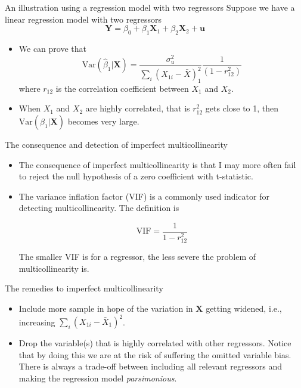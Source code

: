 \documentclass[presentation,10pt]{beamer}
\newcommand{\var}{\mathrm{Var}}
\begin{document}
\begin{frame}[label={sec:orgf4c85d3}]{An illustration using a regression model with two regressors}
Suppose we have a linear regression model with two regressors
\begin{equation}
\label{eq:ex-collin}
\mathbf{Y} = \beta_0 + \beta_1 \mathbf{X}_1 + \beta_2 \mathbf{X}_2 + \mathbf{u}
\end{equation}

\begin{itemize}
\item We can prove that 
\[\var(\hat{\beta}_1 | \mathbf{X}) =
  \frac{\sigma^2_u}{\sum_i (X_{1i} - \bar{X})_1^2} \frac{1}{(1 - r^2_{12})}\]
where \(r_{12}\) is the correlation coefficient between \(X_1\) and \(X_2\).

\item When \(X_1\) and \(X_2\) are highly correlated, that is \(r^2_{12}\) gets
close to 1, then \(\var(\hat{\beta}_1 | \mathbf{X})\) becomes very
large.
\end{itemize}
\end{frame}

\begin{frame}[label={sec:org2e04048}]{The consequence and detection of imperfect multicollinearity}
\begin{itemize}
\item The consequence of imperfect multicollinearity is that I may more
often fail to reject the null hypothesis of a zero coefficient with
t-statistic.

\item The variance inflation factor (VIF) is a commonly used indicator for
detecting multicollinearity. The definition is

\begin{equation*}
\mathrm{VIF} = \frac{1}{1 - r^2_{12}}
\end{equation*}

The smaller VIF is for a regressor, the less severe the problem of
multicollinearity is.
\end{itemize}
\end{frame}

\begin{frame}[label={sec:orga0c6a2c}]{The remedies to imperfect multicollinearity}
\begin{itemize}
\item Include more sample in hope of the variation in \(\mathbf{X}\) getting
widened, i.e., increasing \(\sum_i (X_{1i} - \bar{X}_1)^2\).

\item Drop the variable(s) that is highly correlated with other
regressors. Notice that by doing this we are at the risk of
suffering the omitted variable bias. There is always a trade-off
between including all relevant regressors and making the regression
model \emph{parsimonious}.
\end{itemize}
\end{frame}
\end{document}
